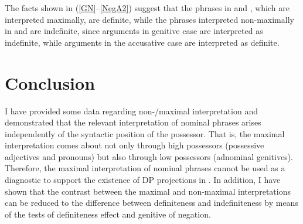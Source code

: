 \documentclass[output=paper]{langscibook}
\begin{document}
\noindent The facts shown in (\ref{GN}--\ref{NegA2}) suggest that the phrases in  and , which are interpreted maximally, are definite, while the phrases interpreted non-maximally in  and  are indefinite, since arguments in genitive case are interpreted as indefinite, while arguments in the accusative case are interpreted as definite.





\section{Conclusion}\label{CON}

I have provided some data regarding non-/maximal interpretation and demonstrated that the relevant interpretation of nominal phrases arises independently of the syntactic position of the possessor. That is, the maximal interpretation comes about not only through high possessors (possessive adjectives and pronouns) but also through low possessors (adnominal genitives). Therefore, the maximal interpretation of nominal phrases cannot be used as a diagnostic to support the existence of DP projections in . In addition, I have shown that the contrast between the maximal and non-maximal interpretations can be reduced to the difference between definiteness and indefiniteness by means of the tests of definiteness effect and genitive of negation.
\end{document}
